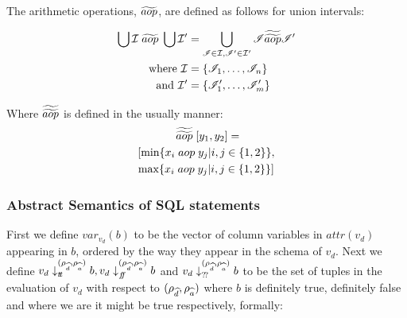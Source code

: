 The arithmetic operations, $\widetilde{aop}$, are defined as follows for union intervals:

\begin{align}\label{eq:abstractBOP}
    \bigcup \mathcal{I} \;\aab{aop}\; \bigcup \mathcal{I}' &= \bigcup_{\mathscr{I}\in \mathcal{I}, \mathscr{I}'\in \mathcal{I}'}\mathscr{I}\aaab{aop}\mathscr{I}'\nonumber\\
    \text{where } \mathcal{I}&=\{\mathscr{I}_1,\dots,\mathscr{I}_n\}\nonumber\\
    \text{and } \mathcal{I}'&=\{\mathscr{I}'_1,\dots,\mathscr{I}'_m\}
\end{align}

Where $\widetilde{\widetilde{aop}}$ is defined in the usually manner:
\begin{multline}
    [x_1, x_2] \; \aaab{aop} \; [y_1, y_2] = \\
    [\min\{x_i \; aop \; y_j | i,j \in \{1, 2\}\}, \\
    \max\{x_i \; aop \; y_j | i,j \in \{1, 2\}\}]
\end{multline}

\subsubsection{Abstract Semantics of SQL statements}\label{subsubsec:abstract-semantics-sql-statements}

First we define $var_{v_d}(b)$ to be the vector of column variables in $attr(v_d)$ appearing in $b$, ordered by the way they appear in the schema of $v_d$.
Next we define $v_d \downarrow_{t\!t}^{(\rho_{\widehat{d}}, \rho_{\widehat{a}})} b, v_d \downarrow_{f\!\!f}^{(\rho_{\widehat{d}}, \rho_{\widehat{a}})} b$ and  $v_d \downarrow_{?\!?}^{(\rho_{\widehat{d}}, \rho_{\widehat{a}})} b$ to be the set of tuples in the evaluation of $v_d$ with respect to $(\rho_{\widehat{d}}, \rho_{\widehat{a}})$ where $b$ is definitely true, definitely false and where we are it might be true respectively, formally:

